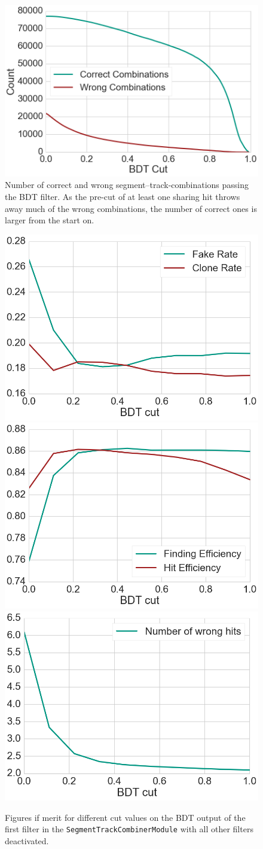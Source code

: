 \begin{figure}
  \centering
  \includegraphics[width=0.7\linewidth]{figures/workflow/first_filter_count.png}
  \caption{Number of correct and wrong segment--track-combinations passing the BDT filter. As the pre-cut of at least one sharing hit throws away much of the wrong combinations, the number of correct ones is larger from the start on.}
  \label{fig-first-filter-count}
\end{figure}

\begin{figure}
  \centering
  \includegraphics[width=0.48\linewidth]{figures/workflow/first_filter_rate.png}
  \includegraphics[width=0.48\linewidth]{figures/workflow/first_filter_efficiency.png}
  \includegraphics[width=0.48\linewidth]{figures/workflow/first_filter_wrong_hits.png}
  \caption{Figures if merit for different cut values on the BDT output of the first filter in the \texttt{SegmentTrackCombinerModule} with all other filters deactivated.}
  \label{fig-first-filter-fom}
\end{figure}


